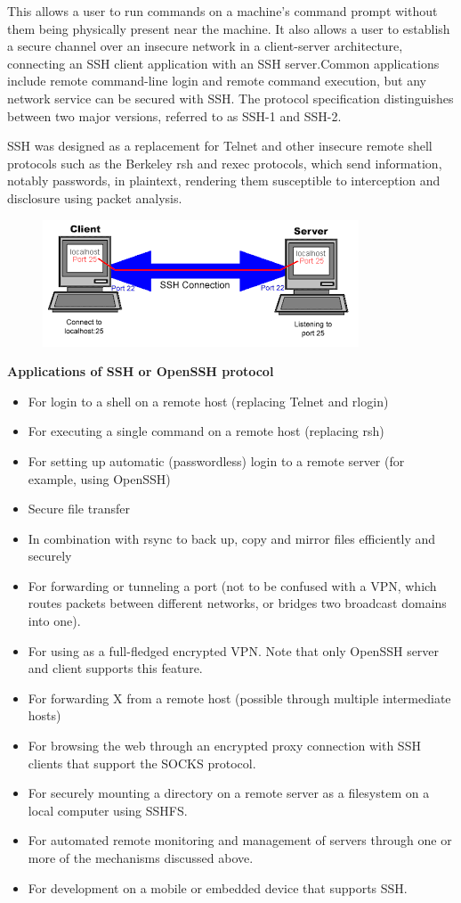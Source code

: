 \documentclass[11pt,a4paper]{article}
\begin{document}
	This allows a user to run commands on a machine's command prompt without them being physically present near the machine. It also allows a user to establish a secure channel over an insecure network in a client-server architecture, connecting an SSH client application with an SSH server.Common applications include remote command-line login and remote command execution, but any network service can be secured with SSH. The protocol specification distinguishes between two major versions, referred to as SSH-1 and SSH-2.
	
	SSH was designed as a replacement for Telnet and other insecure remote shell protocols such as the Berkeley rsh and rexec protocols, which send information, notably passwords, in plaintext, rendering them susceptible to interception and disclosure using packet analysis.
	\begin{figure}[h!]
		\includegraphics{ssh.png}
		\centering
	\end{figure} 
	
	\textbf{Applications of SSH or OpenSSH protocol}
	\begin{itemize}
		\item For login to a shell on a remote host (replacing Telnet and rlogin)
		\item For executing a single command on a remote host (replacing rsh)
		\item For setting up automatic (passwordless) login to a remote server (for example, using OpenSSH)
		\item Secure file transfer
		\item In combination with rsync to back up, copy and mirror files efficiently and securely
		\item For forwarding or tunneling a port (not to be confused with a VPN, which routes packets between different networks, or bridges two broadcast domains into one).
		\item For using as a full-fledged encrypted VPN. Note that only OpenSSH server and client supports this feature.
		\item For forwarding X from a remote host (possible through multiple intermediate hosts)
		\item For browsing the web through an encrypted proxy connection with SSH clients that support the SOCKS protocol.
		\item For securely mounting a directory on a remote server as a filesystem on a local computer using SSHFS.
		\item For automated remote monitoring and management of servers through one or more of the mechanisms discussed above.
		\item For development on a mobile or embedded device that supports SSH.
	\end{itemize}
	
\end{document}
